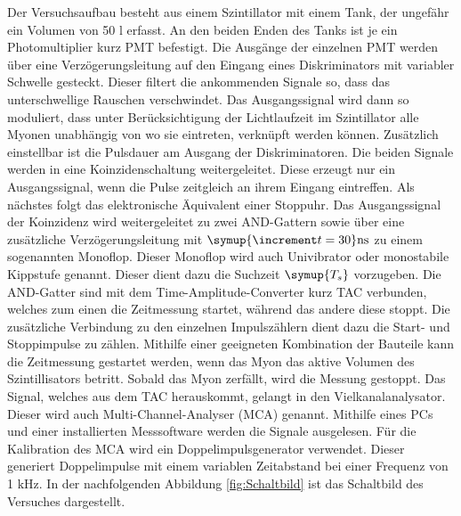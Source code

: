 \noindent Der Versuchsaufbau besteht aus einem Szintillator mit einem Tank, der ungefähr ein Volumen von 50 l erfasst. An den beiden Enden des Tanks ist je ein Photomultiplier kurz PMT befestigt. Die Ausgänge der einzelnen PMT werden über eine Verzögerungsleitung auf den Eingang eines Diskriminators mit variabler Schwelle gesteckt. Dieser filtert die ankommenden Signale so, dass das unterschwellige Rauschen verschwindet. Das Ausgangssignal wird dann so moduliert, dass unter Berücksichtigung der Lichtlaufzeit im Szintillator alle Myonen unabhängig von wo sie eintreten, verknüpft werden können. Zusätzlich einstellbar ist die Pulsdauer am Ausgang der Diskriminatoren. \newline 
\newpage 
\noindent Die beiden Signale werden in eine Koinzidenschaltung weitergeleitet. Diese erzeugt nur ein Ausgangssignal, wenn die Pulse zeitgleich an ihrem Eingang eintreffen. Als nächstes folgt das elektronische Äquivalent einer Stoppuhr. \newline
\noindent Das Ausgangssignal der Koinzidenz wird weitergeleitet zu zwei AND-Gattern sowie über eine zusätzliche Verzögerungsleitung mit $\symup{\increment t= 30} \mathrm{ns}$ zu einem sogenannten Monoflop. Dieser Monoflop wird auch Univibrator oder monostabile Kippstufe genannt. Dieser dient dazu die Suchzeit $\symup{T_s}$ vorzugeben. Die AND-Gatter sind mit dem Time-Amplitude-Converter kurz TAC verbunden, welches zum einen die Zeitmessung startet, während das andere diese stoppt. Die zusätzliche Verbindung zu den einzelnen Impulszählern dient dazu die Start- und Stoppimpulse zu zählen. \newline
\noindent Mithilfe einer geeigneten Kombination der Bauteile kann die Zeitmessung gestartet werden, wenn das Myon das aktive Volumen des Szintillisators betritt. Sobald das Myon zerfällt, wird die Messung gestoppt.\newline
Das Signal, welches aus dem TAC herauskommt, gelangt in den Vielkanalanalysator. Dieser wird auch Multi-Channel-Analyser (MCA) genannt. Mithilfe eines PCs und einer installierten Messsoftware werden die Signale ausgelesen. Für die Kalibration des MCA wird ein Doppelimpulsgenerator verwendet. Dieser generiert Doppelimpulse mit einem variablen Zeitabstand bei einer Frequenz von 1 $\mathrm{kHz}$. \newline
\noindent In der nachfolgenden Abbildung \ref{fig:Schaltbild} ist das Schaltbild des Versuches dargestellt.

